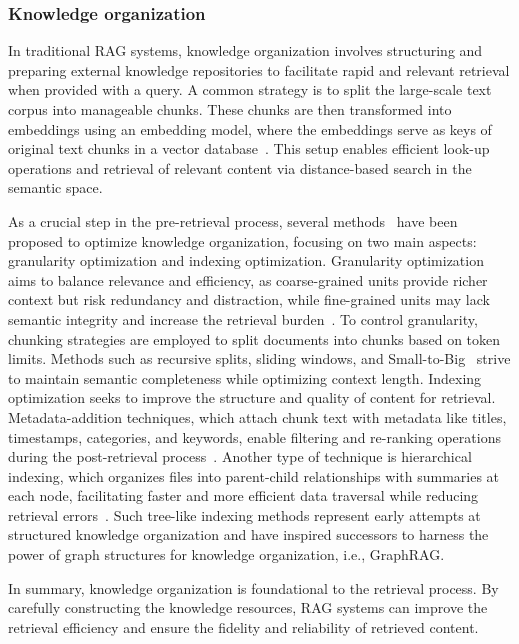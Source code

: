 \documentclass[lettersize,journal]{IEEEtran}
\begin{document}
\subsubsection{Knowledge organization}
In traditional RAG systems, knowledge organization involves structuring and preparing external knowledge repositories to facilitate rapid and relevant retrieval when provided with a query. A common strategy is to split the large-scale text corpus into manageable chunks. These chunks are then transformed into embeddings using an embedding model, where the embeddings serve as keys of original text chunks in a vector database~\cite{borgeaud2022improving,izacard2023atlas,jiang2023active}. This setup enables efficient look-up operations and retrieval of relevant content via distance-based search in the semantic space.

As a crucial step in the pre-retrieval process, several methods~\cite{gao2023retrieval,wang2024searchingforbestpractivesinrag} have been proposed to optimize knowledge organization, focusing on two main aspects: granularity optimization and indexing optimization. Granularity optimization aims to balance relevance and efficiency, as coarse-grained units provide richer context but risk redundancy and distraction, while fine-grained units may lack semantic integrity and increase the retrieval burden~\cite{yu2023chain,zhong2024mixofgranularity}. To control granularity, chunking strategies are employed to split documents into chunks based on token limits. Methods such as recursive splits, sliding windows, and Small-to-Big~\cite{wang2024searchingforbestpractivesinrag,llamaindex_website} strive to maintain semantic completeness while optimizing context length. Indexing optimization seeks to improve the structure and quality of content for retrieval. Metadata-addition techniques, which attach chunk text with metadata like titles, timestamps, categories, and keywords, enable filtering and re-ranking operations during the post-retrieval process~\cite{wang2024searchingforbestpractivesinrag}. Another type of technique is hierarchical indexing, which organizes files into parent-child relationships with summaries at each node, facilitating faster and more efficient data traversal while reducing retrieval errors~\cite{wang2024corag}. Such tree-like indexing methods represent early attempts at structured knowledge organization and have inspired successors to harness the power of graph structures for knowledge organization, i.e., GraphRAG.

In summary, knowledge organization is foundational to the retrieval process. By carefully constructing the knowledge resources, RAG systems can improve the retrieval efficiency and ensure the fidelity and reliability of retrieved content.
\end{document}
